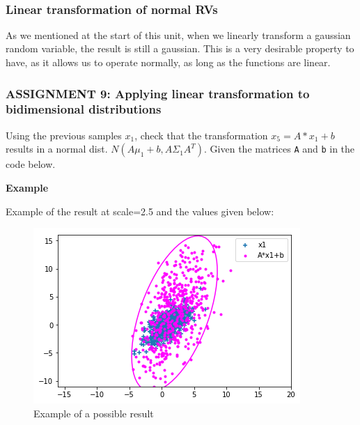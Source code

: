 \documentclass[11pt]{article}
\begin{document}
    \begin{center}
    \end{center}
    { \hspace*{\fill} \\}
    
    \hypertarget{linear-transformation-of-normal-rvs}{%
\subsubsection{Linear transformation of normal
RVs}\label{linear-transformation-of-normal-rvs}}

As we mentioned at the start of this unit, when we linearly transform a
gaussian random variable, the result is still a gaussian. This is a very
desirable property to have, as it allows us to operate normally, as long
as the functions are linear.

    \hypertarget{assignment-9-applying-linear-transformation-to-bidimensional-distributions}{%
\subsubsection{\texorpdfstring{\textbf{{ASSIGNMENT 9: Applying linear
transformation to bidimensional
distributions}}}{ASSIGNMENT 9: Applying linear transformation to bidimensional distributions}}\label{assignment-9-applying-linear-transformation-to-bidimensional-distributions}}

Using the previous samples \(x_1\), check that the transformation
\(x_5 = A*x_1 +b\) results in a normal dist.
\(N(A \mu_1+b, A \Sigma_1 A^T)\). Given the matrices \texttt{A} and
\texttt{b} in the code below.

\textbf{Example}

Example of the result at scale=2.5 and the values given below:

\begin{figure}
\centering
\includegraphics{images/fig2-3-3.png}
\caption{Example of a possible result}
\end{figure}
\end{document}
